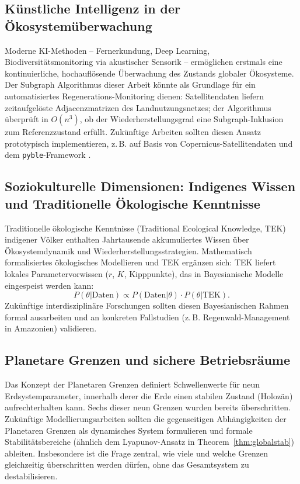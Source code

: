 ﻿\documentclass[a4paper,12pt]{article}
\theoremstyle{definition}
\begin{document}
\subsection{Künstliche Intelligenz in der Ökosystemüberwachung}

Moderne KI-Methoden -- Fernerkundung, Deep Learning, Biodiversitätsmonitoring via akustischer Sensorik -- ermöglichen erstmals eine kontinuierliche, hochauflösende Überwachung des Zustands globaler Ökosysteme. Der Subgraph Algorithmus dieser Arbeit könnte als Grundlage für ein automatisiertes Regenerations-Monitoring dienen: Satellitendaten liefern zeitaufgelöste Adjacenzmatrizen des Landnutzungsnetzes; der Algorithmus überprüft in $O(n^3)$, ob der Wiederherstellungsgrad eine Subgraph-Inklusion zum Referenzzustand erfüllt. Zukünftige Arbeiten sollten diesen Ansatz prototypisch implementieren, z.\,B. auf Basis von Copernicus-Satellitendaten und dem \texttt{pyble}-Framework \cite{epp2026pyble}.

\subsection{Soziokulturelle Dimensionen: Indigenes Wissen und Traditionelle Ökologische Kenntnisse}

Traditionelle ökologische Kenntnisse (Traditional Ecological Knowledge, TEK) indigener Völker enthalten Jahrtausende akkumuliertes Wissen über Ökosystemdynamik und Wiederherstellungsstrategien. Mathematisch formalisiertes ökologisches Modellieren und TEK ergänzen sich: TEK liefert lokales Parametervorwissen ($r$, $K$, Kipppunkte), das in Bayesianische Modelle eingespeist werden kann:
\[
P(\theta | \text{Daten}) \propto P(\text{Daten} | \theta) \cdot P(\theta | \text{TEK}).
\]
Zukünftige interdisziplinäre Forschungen sollten diesen Bayesianischen Rahmen formal ausarbeiten und an konkreten Fallstudien (z.\,B. Regenwald-Management in Amazonien) validieren.

\subsection{Planetare Grenzen und sichere Betriebsräume}

Das Konzept der Planetaren Grenzen \cite{rockstrom2009safe} definiert Schwellenwerte für neun Erdsystemparameter, innerhalb derer die Erde einen stabilen Zustand (Holozän) aufrechterhalten kann. Sechs dieser neun Grenzen wurden bereits überschritten. Zukünftige Modellierungsarbeiten sollten die gegenseitigen Abhängigkeiten der Planetaren Grenzen als dynamisches System formulieren und formale Stabilitätsbereiche (ähnlich dem Lyapunov-Ansatz in Theorem~\ref{thm:globalstab}) ableiten. Insbesondere ist die Frage zentral, wie viele und welche Grenzen gleichzeitig überschritten werden dürfen, ohne das Gesamtsystem zu destabilisieren.
\end{document}
